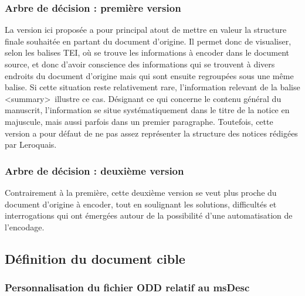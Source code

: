 \documentclass[a4paper,12pt,twoside]{book}
\begin{document}
	\subsubsection{\label{arbre_decision_1}Arbre de décision : première version}
	
	La version ici proposée a pour principal atout de mettre en valeur la structure finale souhaitée en partant du document d'origine. Il permet donc de visualiser, selon les balises TEI, où se trouve les informations à encoder dans le document source, et donc d'avoir conscience des informations qui se trouvent à divers endroits du document d'origine mais qui sont ensuite regroupées sous une même balise. Si cette situation reste relativement rare, l'information relevant de la balise \textless summary\textgreater~illustre ce cas. Désignant ce qui concerne le contenu général du manuscrit, l'information se situe systématiquement dans le titre de la notice en majuscule, mais aussi parfois dans un premier paragraphe. 
	Toutefois, cette version a pour défaut de ne pas assez représenter la structure des notices rédigées par Leroquais. 
	
	
	
	\subsubsection{\label{arbre_decision_2}Arbre de décision : deuxième version}
	
	Contrairement à la première, cette deuxième version se veut plus proche du document d'origine à encoder, tout en soulignant les solutions, difficultés et interrogations qui ont émergées autour de la possibilité d'une automatisation de l'encodage.
	
	
	
	\subsection{Définition du document cible}
	
	\subsubsection{\label{personnalisation_ODD}Personnalisation du fichier ODD relatif au msDesc}
	
\end{document}
